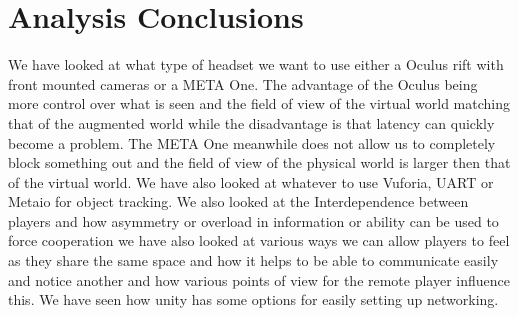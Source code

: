 \section{Analysis Conclusions} \label{sec:analysisconclusion}
 We have looked at what type of headset we want to use either a Oculus rift with front mounted cameras or a META One. The advantage of the Oculus being more control over what is seen and the field of view of the virtual world matching that of the augmented world while the disadvantage is that latency can quickly become a problem. The META One meanwhile does not allow us to completely block something out and the field of view of the physical world is larger then that of the virtual world. We have also looked at whatever to use Vuforia, UART or Metaio for object tracking. 
 We also looked at the Interdependence between players and how asymmetry or overload in information or ability can be used to force cooperation we have also looked at various ways we can allow players to feel as they share the same space and how it helps to be able to communicate easily and notice another and how various points of view for the remote player influence this. We have seen how unity has some options for easily setting up networking. 
  